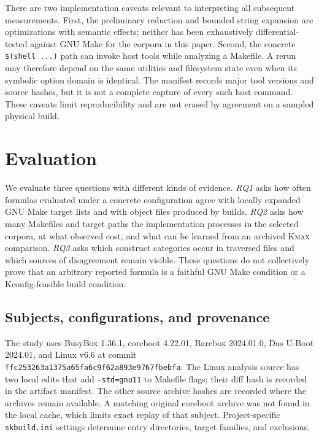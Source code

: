 \documentclass[acmsmall,screen,review]{acmart}
\begin{document}
There are two implementation caveats relevant to interpreting all subsequent measurements. First, the preliminary reduction and bounded string expansion are optimizations with semantic effects; neither has been exhaustively differential-tested against GNU Make for the corpora in this paper. Second, the concrete \texttt{\$(shell ...)} path can invoke host tools while analyzing a Makefile. A rerun may therefore depend on the same utilities and filesystem state even when its symbolic option domain is identical. The manifest records major tool versions and source hashes, but it is not a complete capture of every such host command. These caveats limit reproducibility and are not erased by agreement on a sampled physical build.

\section{Evaluation}
\label{sec:eval}

We evaluate three questions with different kinds of evidence. \emph{RQ1} asks how often formulas evaluated under a concrete configuration agree with locally expanded GNU Make target lists and with object files produced by builds. \emph{RQ2} asks how many Makefiles and target paths the implementation processes in the selected corpora, at what observed cost, and what can be learned from an archived \textsc{Kmax} comparison. \emph{RQ3} asks which construct categories occur in traversed files and which sources of disagreement remain visible. These questions do not collectively prove that an arbitrary reported formula is a faithful GNU Make condition or a Kconfig-feasible build condition.

\subsection{Subjects, configurations, and provenance}
\label{sec:eval:subjects}
The study uses BusyBox 1.36.1, coreboot 4.22.01, Barebox 2024.01.0, Das U-Boot 2024.01, and Linux v6.6 at commit \texttt{ffc253263a1375a65fa6c9f62a893e9767fbebfa}. The Linux analysis source has two local edits that add \texttt{-std=gnu11} to Makefile flags; their diff hash is recorded in the artifact manifest. The other source archive hashes are recorded where the archives remain available. A matching original coreboot archive was not found in the local cache, which limits exact replay of that subject. Project-specific \texttt{skbuild.ini} settings determine entry directories, target families, and exclusions.
\end{document}
